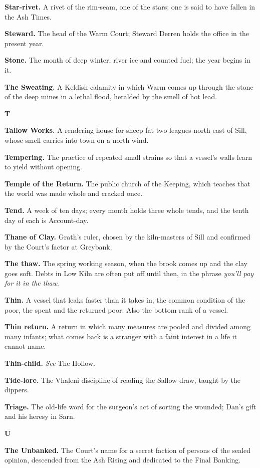 \documentclass{design/chronicle}
\begin{document}
\textbf{Star-rivet.} A rivet of the rim-seam, one of the stars; one is said to have fallen in the Ash Times.

\textbf{Steward.} The head of the Warm Court; Steward Derren holds the office in the present year.

\textbf{Stone.} The month of deep winter, river ice and counted fuel; the year begins in it.

\textbf{The Sweating.} A Keldish calamity in which Warm comes up through the stone of the deep mines in a lethal flood, heralded by the smell of hot lead.

\textbf{T}

\textbf{Tallow Works.} A rendering house for sheep fat two leagues north-east of Sill, whose smell carries into town on a north wind.

\textbf{Tempering.} The practice of repeated small strains so that a vessel’s walls learn to yield without opening.

\textbf{Temple of the Return.} The public church of the Keeping, which teaches that the world was made whole and cracked once.

\textbf{Tend.} A week of ten days; every month holds three whole tends, and the tenth day of each is Account-day.

\textbf{Thane of Clay.} Grath’s ruler, chosen by the kiln-masters of Sill and confirmed by the Court’s factor at Greybank.

\textbf{The thaw.} The spring working season, when the brook comes up and the clay goes soft. Debts in Low Kiln are often put off until then, in the phrase \emph{you’ll pay for it in the thaw}.

\textbf{Thin.} A vessel that leaks faster than it takes in; the common condition of the poor, the spent and the returned poor. Also the bottom rank of a vessel.

\textbf{Thin return.} A return in which many measures are pooled and divided among many infants; what comes back is a stranger with a faint interest in a life it cannot name.

\textbf{Thin-child.} \emph{See} The Hollow.

\textbf{Tide-lore.} The Vhaleni discipline of reading the Sallow draw, taught by the dippers.

\textbf{Triage.} The old-life word for the surgeon’s act of sorting the wounded; Dan’s gift and his heresy in Sarn.

\textbf{U}

\textbf{The Unbanked.} The Court’s name for a secret faction of persons of the sealed opinion, descended from the Ash Rising and dedicated to the Final Banking.
\end{document}
